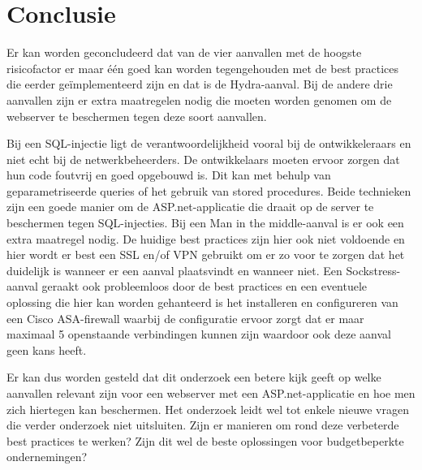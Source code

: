 \documentclass[pdftex,a4paper,12pt]{report}
\begin{document}
\chapter{Conclusie}
\label{ch:conclusie}

Er kan worden geconcludeerd dat van de vier aanvallen met de hoogste risicofactor er maar één goed kan worden tegengehouden met de best practices die eerder geïmplementeerd zijn en dat is de Hydra-aanval. Bij de andere drie aanvallen zijn er extra maatregelen nodig die moeten worden genomen om de webserver te beschermen tegen deze soort aanvallen. \newline

Bij een SQL-injectie ligt de verantwoordelijkheid vooral bij de ontwikkeleraars en niet echt bij de netwerkbeheerders. De ontwikkelaars moeten ervoor zorgen dat hun code foutvrij en goed opgebouwd is. Dit kan met behulp van geparametriseerde queries of het gebruik van stored procedures. Beide technieken zijn een goede manier om de ASP.net-applicatie die draait op de server te beschermen tegen SQL-injecties. Bij een Man in the middle-aanval is er ook een extra maatregel nodig. De huidige best practices zijn hier ook niet voldoende en hier wordt er best een SSL en/of VPN gebruikt om er zo voor te zorgen dat het duidelijk is wanneer er een aanval plaatsvindt en wanneer niet. Een Sockstress-aanval geraakt ook probleemloos door de best practices en een eventuele oplossing die hier kan worden gehanteerd is het installeren en configureren van een Cisco ASA-firewall waarbij de configuratie ervoor zorgt dat er maar maximaal 5 openstaande verbindingen kunnen zijn waardoor ook deze aanval geen kans heeft. \newline

Er kan dus worden gesteld dat dit onderzoek een betere kijk geeft op welke aanvallen relevant zijn voor een webserver met een ASP.net-applicatie en hoe men zich hiertegen kan beschermen. Het onderzoek leidt wel tot enkele nieuwe vragen die verder onderzoek niet uitsluiten. Zijn er manieren om rond deze verbeterde best practices te werken? Zijn dit wel de beste oplossingen voor budgetbeperkte ondernemingen? 








\listoffigures
\listoftables
\end{document}
